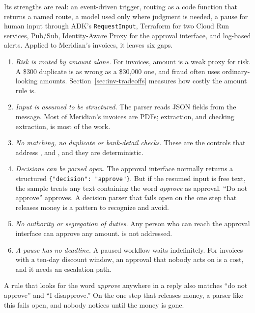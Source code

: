 Its strengths are real: an event-driven trigger, routing as a code function that returns a named route, a model used only where judgment is needed, a pause for human input through ADK's \texttt{RequestInput}, Terraform for two Cloud Run services, Pub/Sub, Identity-Aware Proxy for the approval interface, and log-based alerts. Applied to Meridian's invoices, it leaves six gaps.

\begin{enumerate}[itemsep=2pt]
  \item \emph{Risk is routed by amount alone.} For invoices, amount is a weak proxy for risk. A \$300 duplicate is as wrong as a \$30{,}000 one, and fraud often uses ordinary-looking amounts. Section~\ref{sec:inv-tradeoffs} measures how costly the amount rule is.
  \item \emph{Input is assumed to be structured.} The parser reads JSON fields from the message. Most of Meridian's invoices are PDFs; extraction, and checking extraction, is most of the work.
  \item \emph{No matching, no duplicate or bank-detail checks.} These are the controls that address ,  and , and they are deterministic.
  \item \emph{Decisions can be parsed open.} The approval interface normally returns a structured \texttt{\{"decision": "approve"\}}. But if the resumed input is free text, the sample treats any text containing the word \emph{approve} as approval. ``Do not approve'' approves. A decision parser that fails open on the one step that releases money is a pattern to recognize and avoid.
  \item \emph{No authority or segregation of duties.} Any person who can reach the approval interface can approve any amount.  is not addressed.
  \item \emph{A pause has no deadline.} A paused workflow waits indefinitely. For invoices with a ten-day discount window, an approval that nobody acts on is a cost, and it needs an escalation path.
\end{enumerate}

\begin{watchout}
A rule that looks for the word \emph{approve} anywhere in a reply also matches ``do not approve'' and ``I disapprove.'' On the one step that releases money, a parser like this fails open, and nobody notices until the money is gone.
\end{watchout}

